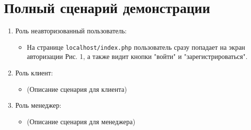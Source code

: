 \documentclass[a4paper,12pt]{article}
\begin{document}
\section{Полный сценарий демонстрации}

\begin{enumerate}
    \item Роль неавторизованный пользователь:
          \begin{itemize}
              \item На странице \texttt{localhost/index.php} пользователь сразу попадает на экран авторизации Рис. 1, а также видит кнопки "войти" и "зарегистрироваться".
          \end{itemize}

    \item Роль клиент:
          \begin{itemize}
              \item (Описание сценария для клиента)
          \end{itemize}

    \item Роль менеджер:
          \begin{itemize}
              \item (Описание сценария для менеджера)
          \end{itemize}
\end{enumerate}
\end{document}
